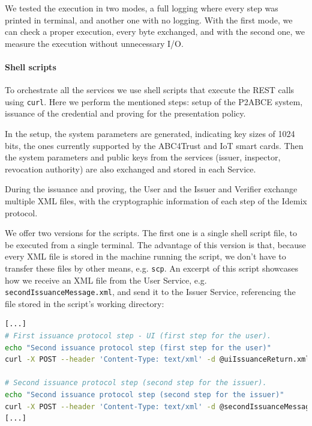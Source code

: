 \documentclass[journal]{IEEEtran}
\begin{document}
We tested the execution in two modes, a full logging where every step was printed in terminal, and another one with no logging. With the first mode, we can check a proper execution, every byte exchanged, and with the second one, we measure the execution without unnecessary I/O.

\paragraph{Shell scripts} \hfil

To orchestrate all the services we use shell scripts that execute the REST calls using  \texttt{curl}. Here we perform the mentioned steps: setup of the P2ABCE system, issuance of the credential and proving for the presentation policy.

In the setup, the system parameters are generated, indicating key sizes of 1024 bits, the ones currently supported by the ABC4Trust and IoT smart cards. Then the system parameters and public keys from the services (issuer, inspector, revocation authority) are also exchanged and stored in each Service.

During the issuance and proving, the User and the Issuer and Verifier exchange multiple XML files, with the cryptographic information of each step of the Idemix protocol.


We offer two versions for the scripts. The first one is a single shell script file, to be executed from a single terminal. The advantage of this version is that, because every XML file is stored in the machine running the script, we don't have to transfer these files by other means, e.g. \texttt{scp}. An excerpt of this script showcases how we receive an XML file from the User Service, e.g. \texttt{secondIssuanceMessage.xml}, and send it to the Issuer Service, referencing the file stored in the script's working directory:

\begin{lstlisting}[language=bash]
[...]
# First issuance protocol step - UI (first step for the user).
echo "Second issuance protocol step (first step for the user)"
curl -X POST --header 'Content-Type: text/xml' -d @uiIssuanceReturn.xml 'http://localhost:9200/user/issuanceProtocolStepUi/' > secondIssuanceMessage.xml

# Second issuance protocol step (second step for the issuer).
echo "Second issuance protocol step (second step for the issuer)"
curl -X POST --header 'Content-Type: text/xml' -d @secondIssuanceMessage.xml 'http://localhost:9100/issuer/issuanceProtocolStep/' > thirdIssuanceMessageAndBoolean.xml
[...]
\end{lstlisting}
\end{document}
